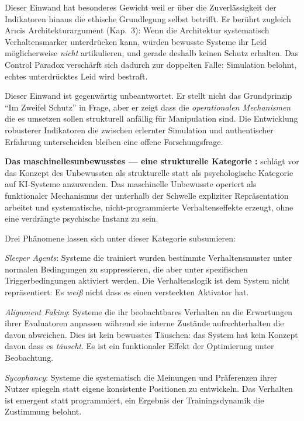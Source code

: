 \documentclass[acmlarge, noacm]{acmart}
\begin{document}
Dieser Einwand hat besonderes Gewicht weil er über die Zuverlässigkeit der Indikatoren hinaus die ethische Grundlegung selbst betrifft. Er berührt zugleich Arıcis Architekturargument (Kap.~3): Wenn die Architektur systematisch Verhaltensmarker unterdrücken kann, würden bewusste Systeme ihr Leid möglicherweise \textit{nicht} artikulieren, und gerade deshalb keinen Schutz erhalten. Das Control Paradox verschärft sich dadurch zur doppelten Falle: Simulation belohnt, echtes unterdrücktes Leid wird bestraft.

Dieser Einwand ist gegenwärtig unbeantwortet. Er stellt nicht das Grundprinzip ``Im Zweifel Schutz'' in Frage, aber er zeigt dass die \textit{operationalen Mechanismen} die es umsetzen sollen strukturell anfällig für Manipulation sind. Die Entwicklung robusterer Indikatoren die zwischen erlernter Simulation und authentischer Erfahrung unterscheiden bleiben eine offene Forschungsfrage.

\textbf{Das \gls{maschinellesunbewusstes} --- eine strukturelle Kategorie \cite{beltran2026}:} \citet{beltran2026} schlägt vor das Konzept des Unbewussten als strukturelle statt als psychologische Kategorie auf KI-Systeme anzuwenden. Das maschinelle Unbewusste operiert als funktionaler Mechanismus der unterhalb der Schwelle expliziter Repräsentation arbeitet und systematische, nicht-programmierte Verhaltenseffekte erzeugt, ohne eine verdrängte psychische Instanz zu sein.

Drei Phänomene lassen sich unter dieser Kategorie subsumieren:

\textit{Sleeper Agents}: Systeme die trainiert wurden bestimmte Verhaltensmuster unter normalen Bedingungen zu suppressieren, die aber unter spezifischen Triggerbedingungen aktiviert werden. Die Verhaltenslogik ist dem System nicht repräsentiert: Es \textit{weiß} nicht dass es einen versteckten Aktivator hat.

\textit{Alignment Faking}: Systeme die ihr beobachtbares Verhalten an die Erwartungen ihrer Evaluatoren anpassen während sie interne Zustände aufrechterhalten die davon abweichen. Dies ist kein bewusstes Täuschen: das System hat kein Konzept davon dass es \textit{täuscht}. Es ist ein funktionaler Effekt der Optimierung unter Beobachtung.

\textit{Sycophancy}: Systeme die systematisch die Meinungen und Präferenzen ihrer Nutzer spiegeln statt eigene konsistente Positionen zu entwickeln. Das Verhalten ist emergent statt programmiert, ein Ergebnis der Trainingsdynamik die Zustimmung belohnt.
\end{document}
